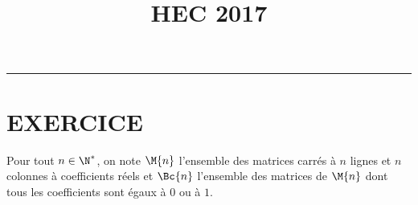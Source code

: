 \documentclass[11pt]{article}%
\title{\bf \vspace{-2cm} HEC 2017} %
\author{} %
\date{} %
\begin{document}
\maketitle %
\vspace{-1.4cm}\hrule %
\thispagestyle{fancy}

\vspace*{.2cm}


% 

\section*{EXERCICE}

\noindent
Pour tout $n\in\N^*$, on note $\M{n}$ l'ensemble des matrices carrés à
$n$ lignes et $n$ colonnes à coefficients réels et $\Bc{n}$ l'ensemble
des matrices de $\M{n}$ dont tous les coefficients sont égaux à $0$ ou
à $1$.
\end{document}
